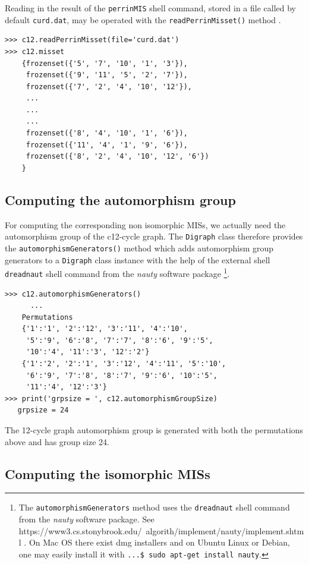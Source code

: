 Reading in the result of the \texttt{perrinMIS} shell command, stored in a file called by default \texttt{curd.dat}, may be operated with the \texttt{readPerrinMisset()} method .
\begin{lstlisting}
>>> c12.readPerrinMisset(file='curd.dat')
>>> c12.misset
    {frozenset({'5', '7', '10', '1', '3'}),
     frozenset({'9', '11', '5', '2', '7'}),
     frozenset({'7', '2', '4', '10', '12'}),
     ...
     ...
     ...
     frozenset({'8', '4', '10', '1', '6'}),
     frozenset({'11', '4', '1', '9', '6'}),
     frozenset({'8', '2', '4', '10', '12', '6'})
    }
\end{lstlisting}

\subsection{Computing the automorphism group}
\label{sec:21.7.2}

For computing the corresponding non isomorphic MISs, we actually need the automorphism group of the c12-cycle graph. The \texttt{Digraph} class therefore provides the \texttt{automorphismGenerators()} method which adds automorphism group generators to a \texttt{Digraph} class instance with the help of the external shell \texttt{dreadnaut} shell command from the \emph{nauty} software package \footnote{The \texttt{automorphismGenerators} method uses the \texttt{dreadnaut} shell command from the \emph{nauty} software package. See https://www3.cs.stonybrook.edu/~algorith/implement/nauty/implement.shtml . On Mac OS there exist dmg installers and on Ubuntu Linux or Debian, one may easily install it with \texttt{...\$ sudo apt-get install nauty}.}.
\begin{lstlisting}
>>> c12.automorphismGenerators()
      ...
    Permutations
    {'1':'1', '2':'12', '3':'11', '4':'10',
     '5':'9', '6':'8', '7':'7', '8':'6', '9':'5',
     '10':'4', '11':'3', '12':'2'}
    {'1':'2', '2':'1', '3':'12', '4':'11', '5':'10', 
     '6':'9', '7':'8', '8':'7', '9':'6', '10':'5', 
     '11':'4', '12':'3'}
>>> print('grpsize = ', c12.automorphismGroupSize)
   grpsize = 24
\end{lstlisting}
The 12-cycle graph automorphism group is generated with both the permutations above and has group size 24.

\subsection{Computing the isomorphic MISs}
\label{sec:21.7.3}

